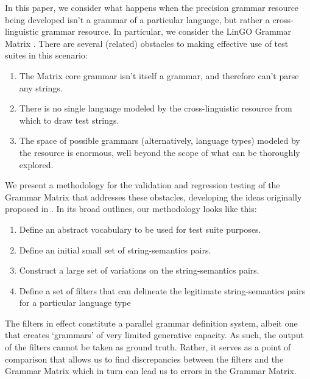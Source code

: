 \documentclass[11pt]{article}
\begin{document}
In this paper, we consider what happens when the precision grammar
resource being developed isn't a grammar of a particular language, but
rather a cross-linguistic grammar resource.  In particular, we
consider the LinGO Grammar Matrix
\cite{Ben:Fli:Oep:02,Ben:Fli:05,Dre:Ben:05}.  There are several
(related) obstacles to making effective use of test suites in this
scenario:

\begin{enumerate}
\item The Matrix core grammar isn't itself a grammar, and therefore
can't parse any strings.
\item There is no single language modeled by the cross-linguistic resource
from which to draw test strings.
\item The space of possible grammars (alternatively, language types) modeled
by the resource is enormous, well beyond the scope of what can be 
thoroughly explored.
\end{enumerate}

We present a methodology for the validation and regression testing of
the Grammar Matrix that addresses these obstacles, developing the ideas
originally proposed in . In its broad
outlines, our methodology looks like this:

\begin{enumerate}
\item Define an abstract vocabulary to be used for test suite purposes.
\item Define an initial small set of string-semantics pairs.
\item Construct a large set of variations on the string-semantics pairs.
\item Define a set of filters that can delineate the legitimate string-semantics pairs for a particular language type
\end{enumerate}
%
The filters in effect constitute a parallel grammar definition
system, albeit one that creates `grammars' of very limited generative
capacity.  As such, the output of the filters cannot be taken as
ground truth.  Rather, it serves as a point of comparison that allows
us to find discrepancies between the filters and the Grammar Matrix which in turn
can lead us to errors in the Grammar Matrix.
\end{document}
